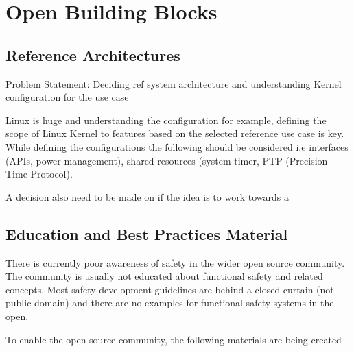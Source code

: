 \documentclass[12pt]{ElisaPaper}
\begin{document}
\section{Open Building Blocks}

\subsection{Reference Architectures}
Problem Statement: Deciding ref system architecture and understanding Kernel configuration for the use case

Linux is huge and understanding the configuration for example, defining the scope of Linux Kernel to features based on the selected reference use case is key. While defining the configurations the following should be considered i.e interfaces (APIs, power management), shared resources (system timer, PTP (Precision Time Protocol). 

A decision also need to be made on if the idea is to work towards a  
\subsection{Education and Best Practices Material}
There is currently poor awareness of safety in the wider open source community. The  community is usually not educated about functional safety and related concepts. Most safety development guidelines are behind a closed curtain (not public domain) and there are no examples for functional safety systems in the open.

To enable the open source community, the following materials are being created
\end{document}
